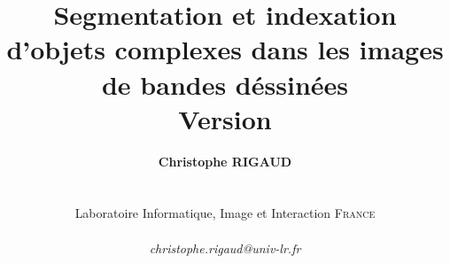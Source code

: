 \documentclass[a4paper,14pt]{book}
\begin{document}
\author{
\textbf{Christophe RIGAUD}\\
~\\ ~\\
Laboratoire Informatique, Image et Interaction \textsc{France}\\
~\\
\textit{christophe.rigaud@univ-lr.fr}\\
}

\title{
\textbf{\huge Segmentation et indexation d'objets complexes dans les images de bandes d{\'e}ssin{\'e}es}
\\
Version 
}


\thispagestyle{empty}

\pagestyle{fancy}





\newpage
\thispagestyle{empty}
\newpage $\ $
\newpage
\thispagestyle{empty}

\end{document}
